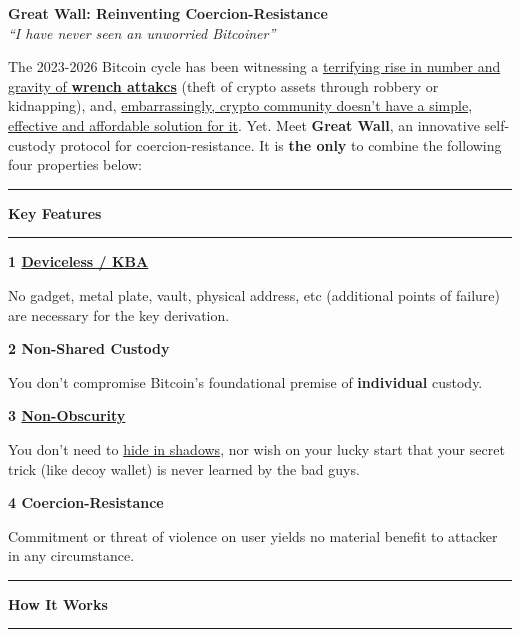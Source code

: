 \documentclass[8pt]{article}
\newcommand{\obsegg}{https://www.linkedin.com/posts/lugano-plan-b_luganoplanb-bitcoin-activity-7167881837728493568-LEZk/}
\newcommand{\theproblem}{https://x.com/search?q=jameson\%20lopp\%20wrench\%20attack&src=typed_query&f=live}
\newcommand{\nocurrentsolution}{https://www.youtube.com/watch?v=MsfR6ZIkzPs&t=2734s}
\newcommand{\kba}{https://en.wikipedia.org/wiki/Knowledge-based_authentication}
\newcommand{\kprinciple}{https://en.wikipedia.org/wiki/Kerckhoffs's_principle}
\newcommand{\feature}[2]{
    \noindent\textbf{\large #1}\par
    \vspace{2pt}
    #2
    \vspace{11pt}
}
\begin{document}
\pagestyle{empty}  %
\begin{center}
    \vspace*{-1cm}
    {\huge\bfseries\color{accent} Great Wall: Reinventing Coercion-Resistance}\\[1ex]
    {\large\textit{``I have never seen an unworried Bitcoiner''}}
    \vspace{0.3cm}
\end{center}

\noindent
The 2023-2026 Bitcoin cycle has been witnessing a \href{\theproblem}{terrifying rise in number and gravity of \textbf{wrench attakcs}} (theft of crypto assets through robbery or kidnapping), and, \href{\nocurrentsolution}{embarrassingly, crypto community doesn't have a simple, effective and affordable solution for it}. Yet. Meet \textbf{Great Wall}, an innovative self-custody protocol for coercion-resistance. It is \textbf{the only} to combine the following four properties below: 

\vspace{0.3cm}

{\color{accent}\hrule}
\vspace{0.2cm}
{\Large\textbf{Key Features}}
\vspace{0.2cm}
{\color{accent}\hrule}
\vspace{0.3cm}

\begin{multicols}{2}
    \feature{1 \href{\kba}{Deviceless / KBA}}{
        No gadget, metal plate, vault, physical address, etc (additional points of failure) are necessary for the key derivation. 
    }

    \feature{2 Non-Shared Custody}{
        You don't compromise Bitcoin's foundational premise of \textbf{individual} custody.
    }

    \feature{3 \href{\kprinciple}{Non-Obscurity}}{
        You don't need to \href{\obsegg}{hide in shadows}, nor wish on your lucky start that your secret trick (like decoy wallet) is never learned by the bad guys.
    }

    \feature{4 Coercion-Resistance}{
        Commitment or threat of violence on user yields no material benefit to attacker in any circumstance.
    }
\end{multicols}


{\color{accent}\hrule}
\vspace{0.2cm}
{\Large\textbf{How It Works}}
\vspace{0.2cm}
{\color{accent}\hrule}
\vspace{0.3cm}
\end{document}
